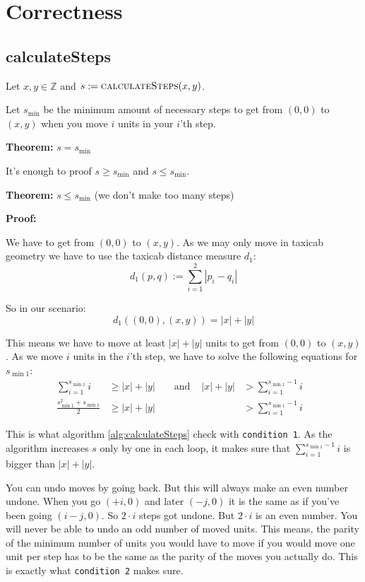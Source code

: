\documentclass[a4paper]{scrartcl}
\newenvironment{myindentpar}[1]%
 {\begin{list}{}%
         {\setlength{\leftmargin}{#1}}%
         \item[]%
 }
 {\end{list}}
\begin{document}
\section{Correctness}
\subsection{calculateSteps}
Let $x,y \in \mathbb{Z}$ and $s := \Call{calculateSteps}{x, y}$.

Let $s_{\min}$ be the minimum amount of necessary steps to get from $(0,0)$
to $(x,y)$ when you move $i$ units in your $i$'th step.

\textbf{Theorem: } $s = s_{\min}$

It's enough to proof $s \geq s_{\min}$ and $s \leq s_{\min}$.

\begin{myindentpar}{1cm}
\textbf{Theorem: } $s \leq s_{\min}$ (we don't make too many steps)

\textbf{Proof: }
\begin{myindentpar}{1cm}
We have to get from $(0,0)$ to $(x, y)$. As we may only move in
taxicab geometry we have to use the taxicab distance measure $d_1$:
\[d_1 \left (p, q \right ) := \sum_{i=1}^2 |p_i -q_i|\]

So in our scenario:
\[d_1 \left ((0,0), (x,y) \right ) = |x| + |y|\]

This means we have to move at least $|x| + |y|$ units to get
from $(0,0)$ to $(x, y)$. As we move $i$ units in the $i$'th step,
we have to solve the following equations for $s_{\min1}$:
\begin{align}
    \sum_{i=1}^{s_{\min1}} i          &\geq |x| + |y| &&\text{ and } &|x| + |y|      &> \sum_{i=1}^{s_{\min1} - 1} i\\
    \frac{s_{\min1}^2 + s_{\min1}}{2} &\geq |x| + |y| &&             &               &> \sum_{i=1}^{s_{\min1} - 1} i &
\end{align}

This is what algorithm \ref{alg:calculateSteps} check with \texttt{condition 1}.
As the algorithm increases $s$ only by one in each loop, it makes
sure that $\sum_{i=1}^{s_{\min1} - 1} i$ is bigger than $|x| + |y|$.

You can undo moves by going back. But this will always make an even
number undone. When you go $(+i, 0)$ and later $(-j, 0)$ it is the
same as if you've been going $(i-j, 0)$. So $2\cdot i$ steps got undone.
But $2\cdot i$ is an even number. You will never be able to undo
an odd number of moved units. This means, the parity of the minimum
number of units you would have to move if you would move one unit per
step has to be the same as the parity of the moves you actually do.
This is exactly what \texttt{condition 2} makes sure.


\end{myindentpar}
\end{myindentpar}
\end{document}
